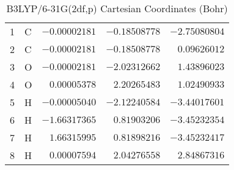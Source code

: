 \documentclass[10pt,oneside]{article}
\begin{document}
\begin{table}[h]
\centering
\caption{B3LYP/6-31G(2df,p) Cartesian Coordinates (Bohr)}
\begin{tabular}{llrrr}
\toprule
1  & C  & $-0.00002181$ & $-0.18508778$ & $-2.75080804$ \\
2  & C  & $-0.00002181$ & $-0.18508778$ & $ 0.09626012$ \\
3  & O  & $-0.00002181$ & $-2.02312662$ & $ 1.43896023$ \\
4  & O  & $ 0.00005378$ & $ 2.20265483$ & $ 1.02490933$ \\
5  & H  & $-0.00005040$ & $-2.12240584$ & $-3.44017601$ \\
6  & H  & $-1.66317365$ & $ 0.81903206$ & $-3.45232354$ \\
7  & H  & $ 1.66315995$ & $ 0.81898216$ & $-3.45232417$ \\
8  & H  & $ 0.00007594$ & $ 2.04276558$ & $ 2.84867316$ \\
\bottomrule
\end{tabular}
\end{table}
\end{document}

